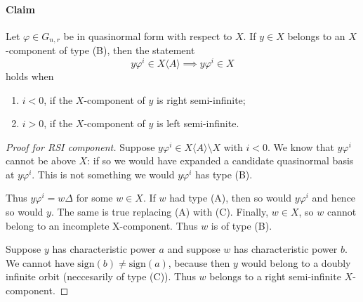 \documentclass[12pt]{article}
\let\phi\varphi
\def\ofA{\langle A \rangle}
\begin{document}
\paragraph{Claim} Let $\phi \in G_{n,r}$ be in quasinormal form with respect to $X$. If $y\in X$ belongs to an $X$-component of type (B), then the statement $$y \phi^{i}\in X\ofA \implies y\phi^{i} \in X$$ holds when
\begin{enumerate}
	\item $i < 0$, if the $X$-component of $y$ is right semi-infinite;
	\item $i > 0$, if the $X$-component of $y$ is left semi-infinite.
\end{enumerate}
\begin{proof}[Proof for RSI component] Suppose $y \phi^{i} \in X\ofA \setminus X$ with $i < 0$. We know that $y \phi^{i}$ cannot be above $X$: if so we would have expanded a candidate quasinormal basis at $y \phi^{i}$. This is not something we would $y \phi^{i}$ has type (B).

Thus $y \phi^{i} = w\Delta$ for some $w \in X$. If $w$ had type (A), then so would $y\phi^i$ and hence so would $y$. The same is true replacing (A) with (C). Finally, $w \in X$, so $w$ cannot belong to an incomplete X-component. Thus $w$ is of type (B).

Suppose $y$ has characteristic power $a$ and suppose $w$ has characteristic power $b$. We cannot have $\mathrm{sign}(b) \neq \mathrm{sign}(a)$, because then $y$ would belong to a doubly infinite orbit (neccesarily of type (C)). Thus $w$ belongs to a right semi-infinite $X$-component. 

\end{proof}
\end{document}
